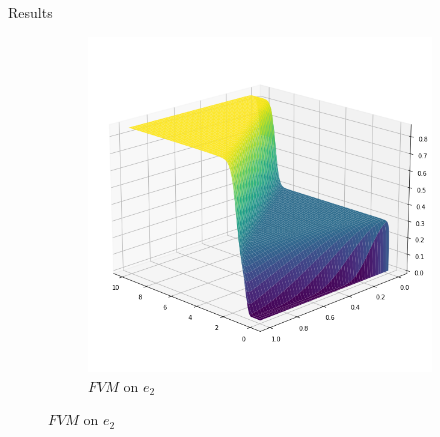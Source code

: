 \documentclass[9pt]{beamer}
\begin{document}
\begin{frame}{Results}
\begin{figure}[H]
\begin{center}
\begin{subfigure}[b]{0.4\textwidth}
\begin{center}
                    \includegraphics[scale=0.25]{img/FVM2.png}
                \end{center}
                \caption{$FVM$ on $e_2$}
            \end{subfigure}
        \end{center}
    \end{figure}
\end{frame}
\end{document}
